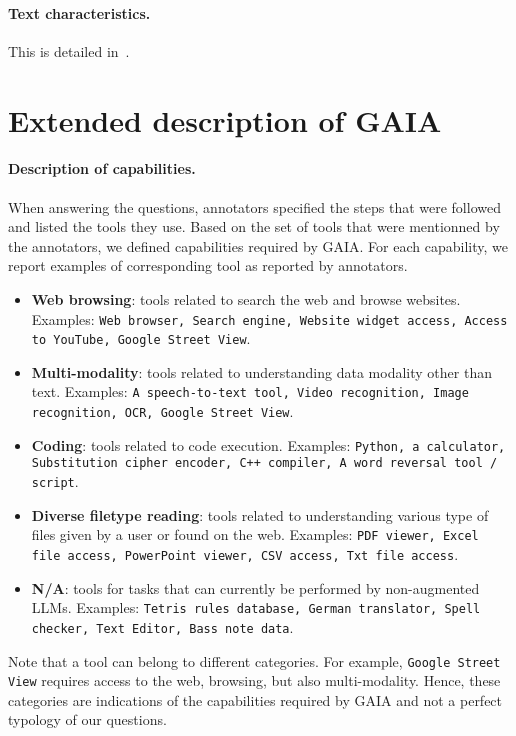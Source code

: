 \documentclass{fairmeta}
\newcommand{\benchmark}{\textsc{GAIA}}
\begin{document}
\paragraph{Text characteristics.} This is detailed in~.

\section{Extended description of \benchmark{}}
\label{sec:extended_description}

\paragraph{Description of capabilities.} When answering the questions, annotators specified the steps that were followed and listed the tools they use. Based on the set of tools that were mentionned by the annotators, we defined capabilities required by \benchmark{}. For each capability, we report examples of corresponding tool as reported by annotators.
\begin{itemize}
    \item \textbf{Web browsing}: tools related to search the web and browse websites. Examples: \texttt{Web browser, Search engine, Website widget access, Access to YouTube, Google Street View}.
    \item \textbf{Multi-modality}: tools related to understanding data modality other than text. Examples: \texttt{A speech-to-text tool, Video recognition, Image recognition, OCR, Google Street View}.
    \item \textbf{Coding}: tools related to code execution. Examples: \texttt{Python, a calculator, Substitution cipher encoder, C++ compiler, A word reversal tool / script}.
    \item \textbf{Diverse filetype reading}: tools related to understanding various type of files given by a user or found on the web. Examples: \texttt{PDF viewer, Excel file access, PowerPoint viewer, CSV access, Txt file access}.
    \item \textbf{N/A}: tools for tasks that can currently be performed by non-augmented LLMs. Examples: \texttt{Tetris rules database, German translator, Spell checker, Text Editor, Bass note data}.
\end{itemize}
Note that a tool can belong to different categories. For example, \texttt{Google Street View} requires access to the web, browsing, but also multi-modality. Hence, these categories are indications of the capabilities required by \benchmark{} and not a perfect typology of our questions.
\end{document}
